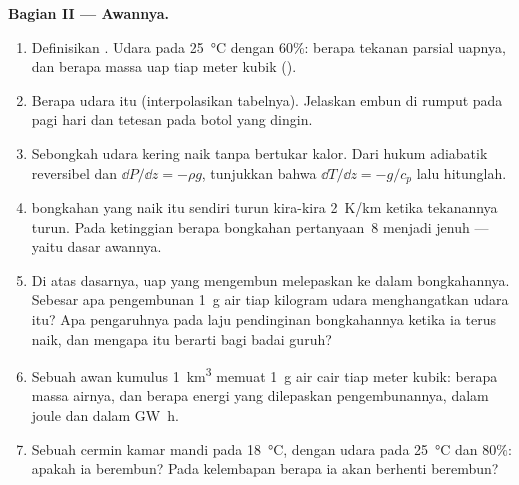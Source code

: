 \begin{problem}
\medskip
\noindent\textbf{Bagian II --- Awannya.}
\begin{enumerate}[resume]
  \item Definisikan . Udara pada \qty{25}{\degreeCelsius} dengan $60\%$:
        berapa tekanan parsial uapnya, dan berapa massa uap tiap meter kubik
        ().
  \item Berapa  udara itu (interpolasikan tabelnya). Jelaskan embun
        di rumput pada pagi hari dan tetesan pada botol yang dingin.
  \item Sebongkah udara kering naik tanpa bertukar kalor. Dari
        hukum adiabatik reversibel dan 
        $\dd P/\dd z = -\rho g$, tunjukkan bahwa $\dd T/\dd z = -g/c_p$ lalu
        hitunglah.
  \item {} bongkahan yang naik itu sendiri turun kira-kira
        \qty{2}{K/km} ketika tekanannya turun. Pada ketinggian berapa bongkahan
        pertanyaan~8 menjadi jenuh --- yaitu dasar awannya.
  \item Di atas dasarnya, uap yang mengembun melepaskan 
        ke dalam bongkahannya. Sebesar apa pengembunan \qty{1}{g}
        air tiap kilogram udara menghangatkan udara itu? Apa pengaruhnya pada
        laju pendinginan bongkahannya ketika ia terus naik, dan mengapa itu
        berarti bagi badai guruh?
  \item Sebuah awan kumulus \qty{1}{km^3} memuat \qty{1}{g} air cair tiap meter
        kubik: berapa massa airnya, dan berapa energi yang dilepaskan
        pengembunannya, dalam joule dan dalam \unit{GW h}.
  \item Sebuah cermin kamar mandi pada \qty{18}{\degreeCelsius}, dengan udara pada
        \qty{25}{\degreeCelsius} dan $80\%$: apakah ia berembun? Pada kelembapan berapa
        ia akan berhenti berembun?
\end{enumerate}


\end{problem}
